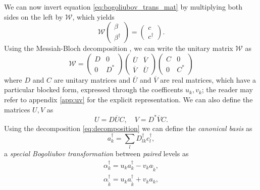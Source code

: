 We can now invert equation \eqref{eq:bogoliubov_trans_mat} by multiplying both sides on the left by $\mathcal W$, which yields 
\begin{equation*}
    \mathcal W \begin{pmatrix}
        \beta\\
        \beta^\dagger
    \end{pmatrix}
    =\begin{pmatrix}
        c\\
        c^\dagger
    \end{pmatrix}.
\end{equation*}
Using the Messiah-Bloch decomposition \cite{blochmessiah}, we can write the unitary matrix $\mathcal W$ as
\begin{equation}
    \label{eq:decomposition}
    \mathcal W = \begin{pmatrix}
        D & 0 \\
        0 & D^*
    \end{pmatrix}
    \begin{pmatrix}
        \overline U & \overline V \\
        \overline V & \overline U
    \end{pmatrix}
    \begin{pmatrix}
        C & 0 \\
        0 & C^*
    \end{pmatrix}
\end{equation}
where $D$ and $C$ are unitary matrices and $\overline U$ and $\overline V$ are real matrices, which have a particular blocked form, expressed through the coefficents $u_k, v_k$; the reader may refer to appendix \ref{app:uv} for the explicit representation. We can also define the matrices $U, V$ as 
\begin{equation}
    U=D\overline U C,\quad V=D^*\overline V C.
\end{equation}
Using the decomposition \eqref{eq:decomposition} we can define the \textit{canonical basis} as
\begin{equation}
    \label{eq:canonical_basis}
    a_k^\dagger = \sum_l D_{lk}^\dagger c_l^\dagger,
\end{equation}
a \textit{special Bogoliubov transformation} between \textit{paired} levels as
\begin{align}
    \alpha_k^\dagger = u_k a_k^\dagger - v_k a_{\tilde k},\\
    \alpha_{\tilde k } ^\dagger = u_k a_{\tilde k} ^\dagger + v_k a_k,
\end{align}
